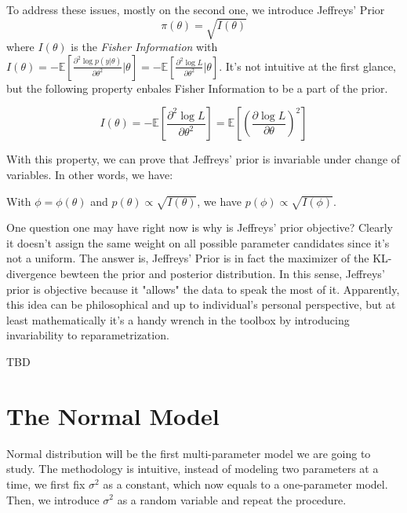 To address these issues, mostly on the second one, we introduce Jeffreys' Prior
\begin{equation*}
    \pi(\theta) = \sqrt{I(\theta)}
\end{equation*}
where $I(\theta)$ is the \emph{Fisher Information} with $I(\theta) = - \mathbb{E}[\frac{\partial^2 \log p(y|\theta)}{\partial\theta^2} | \theta] = -\mathbb{E}[\frac{\partial^2 \log L}{\partial \theta^2} | \theta]$. It's not intuitive at the first glance, but the following property enbales Fisher Information to be a part of the prior.

\begin{proposition}
    \begin{equation*}
        I(\theta) = - \mathbb{E}[\frac{\partial^2 \log L}{\partial \theta^2}] = \mathbb{E}[( \frac{\partial \log L}{\partial \theta} )^2]
    \end{equation*}
\end{proposition}

With this property, we can prove that Jeffreys' prior is invariable under change of variables. In other words, we have:
\begin{theorem}
    With $\phi = \phi(\theta)$ and $p(\theta) \propto \sqrt{I(\theta)}$, we have $p(\phi) \propto \sqrt{I(\phi)}$.
\end{theorem}

One question one may have right now is why is Jeffreys' prior objective? Clearly it doesn't assign the same weight on all possible parameter candidates since it's not a uniform. The answer is, Jeffreys' Prior is in fact the maximizer of the KL-divergence bewteen the prior and posterior distribution. In this sense, Jeffreys' prior is objective because it "allows" the data to speak the most of it. Apparently, this idea can be philosophical and up to individual's personal perspective, but at least mathematically it's a handy wrench in the toolbox by introducing invariability to reparametrization. 

\begin{note}
    TBD
\end{note}

\section{The Normal Model}
Normal distribution will be the first multi-parameter model we are going to study. The methodology is intuitive, instead of modeling two parameters at a time, we first fix $\sigma^2$ as a constant, which now equals to a one-parameter model. Then, we introduce $\sigma^2$ as a random variable and repeat the procedure. 

